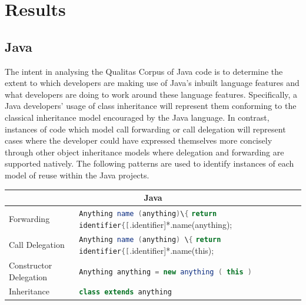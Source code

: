 \documentclass[11pt
              , a4paper
              , twoside
              , openright
              ]{report}
\newcommand{\java}[1]{\lstinline[language=Java]{#1}}
\providecommand{\DIFaddend}{} %
\begin{document}
 \DIFaddend \newpage 
\chapter{Results}\label{C:results} 
\section{Java}
The intent in analysing the Qualitas Corpus of Java code is to determine the extent to which developers are making use of Java's inbuilt language features and what developers are doing to work around these language features. Specifically, a Java developers' usage of class inheritance will represent them conforming to the classical inheritance model encouraged by the Java language. In contrast, instances of code which model call forwarding or call delegation will represent cases where the developer could have expressed themselves more concisely through other object inheritance models where delegation and forwarding are supported natively. The following patterns are used to identify instances of each model of reuse within the Java projects.

\begin{center}
	\label{JavaPatterns}
	\begin{tabular}{|p{5cm}|p{9cm}|}
		\hline

		\multicolumn{2}{|c|}{Java}                                                                   

		\\ \hline

		Forwarding                     & \java{Anything name (anything)\{} \newline  \hphantom{----}\java{return identifier{[}.identifier{]}*.name(anything);} \newline
		\java{\}}  \\ 
		\hline

		Call Delegation                     & \java{Anything name (anything) \{} \newline   \hphantom{----}\java{return identifier{[}.identifier{]}*.name(this);} \newline \java{\}}		
		\\ \hline

		Constructor Delegation & \java{Anything anything = new anything ( this )}

		\\ \hline

		Inheritance                    & \java{class extends anything}

		\\ \hline
	\end{tabular}\newline\newline
\end{center}
\end{document}
